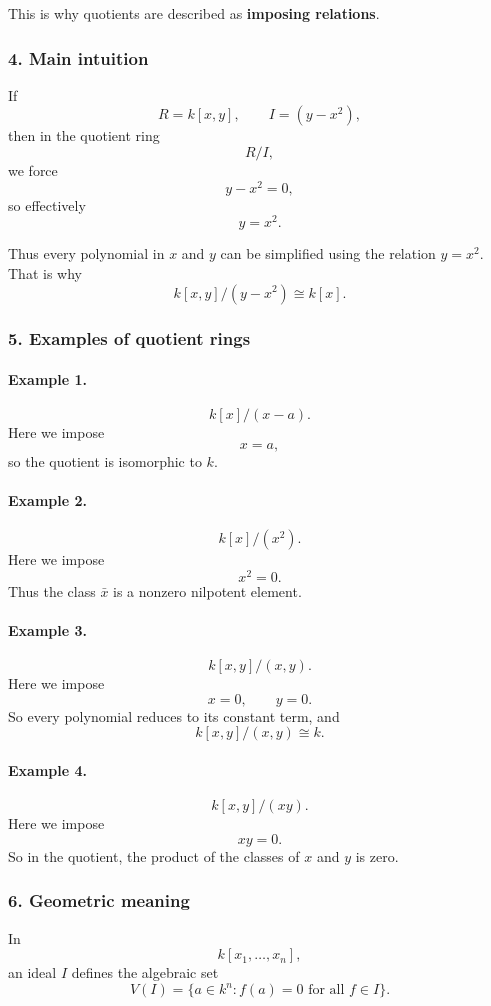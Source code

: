 \documentclass[12pt,a4paper]{article}
\theoremstyle{plain}
\theoremstyle{definition}      %
\begin{document}
	This is why quotients are described as \textbf{imposing relations}.
	
	\subsubsection*{4. Main intuition}
	
	If
	\[
	R=k[x,y],\qquad I=(y-x^2),
	\]
	then in the quotient ring
	\[
	R/I,
	\]
	we force
	\[
	y-x^2=0,
	\]
	so effectively
	\[
	y=x^2.
	\]
	
	Thus every polynomial in \(x\) and \(y\) can be simplified using the relation \(y=x^2\).
	That is why
	\[
	k[x,y]/(y-x^2)\cong k[x].
	\]
	
	\subsubsection*{5. Examples of quotient rings}
	
	\paragraph{Example 1.}
	\[
	k[x]/(x-a).
	\]
	Here we impose
	\[
	x=a,
	\]
	so the quotient is isomorphic to \(k\).
	
	\paragraph{Example 2.}
	\[
	k[x]/(x^2).
	\]
	Here we impose
	\[
	x^2=0.
	\]
	Thus the class \(\bar x\) is a nonzero nilpotent element.
	
	\paragraph{Example 3.}
	\[
	k[x,y]/(x,y).
	\]
	Here we impose
	\[
	x=0,\qquad y=0.
	\]
	So every polynomial reduces to its constant term, and
	\[
	k[x,y]/(x,y)\cong k.
	\]
	
	\paragraph{Example 4.}
	\[
	k[x,y]/(xy).
	\]
	Here we impose
	\[
	xy=0.
	\]
	So in the quotient, the product of the classes of \(x\) and \(y\) is zero.
	
	\subsubsection*{6. Geometric meaning}
	
	In
	\[
	k[x_1,\dots,x_n],
	\]
	an ideal \(I\) defines the algebraic set
	\[
	V(I)=\{a\in k^n:f(a)=0\text{ for all }f\in I\}.
	\]
	
\end{document}
